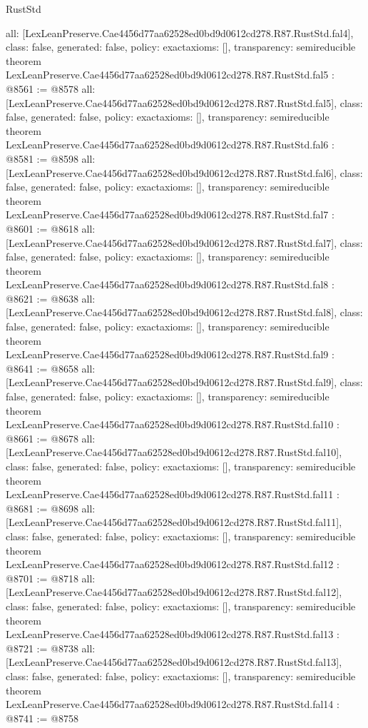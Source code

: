 \begin{lexlean}{RustStd}
\begin{coremodule}
{  all: [LexLeanPreserve.Cae4456d77aa62528ed0bd9d0612cd278.R87.RustStd.fal4],
  class: false,
  generated: false,
  policy: exact{axioms: []},
  transparency: semireducible
}
theorem LexLeanPreserve.Cae4456d77aa62528ed0bd9d0612cd278.R87.RustStd.fal5 : @8561 := @8578 {
  all: [LexLeanPreserve.Cae4456d77aa62528ed0bd9d0612cd278.R87.RustStd.fal5],
  class: false,
  generated: false,
  policy: exact{axioms: []},
  transparency: semireducible
}
theorem LexLeanPreserve.Cae4456d77aa62528ed0bd9d0612cd278.R87.RustStd.fal6 : @8581 := @8598 {
  all: [LexLeanPreserve.Cae4456d77aa62528ed0bd9d0612cd278.R87.RustStd.fal6],
  class: false,
  generated: false,
  policy: exact{axioms: []},
  transparency: semireducible
}
theorem LexLeanPreserve.Cae4456d77aa62528ed0bd9d0612cd278.R87.RustStd.fal7 : @8601 := @8618 {
  all: [LexLeanPreserve.Cae4456d77aa62528ed0bd9d0612cd278.R87.RustStd.fal7],
  class: false,
  generated: false,
  policy: exact{axioms: []},
  transparency: semireducible
}
theorem LexLeanPreserve.Cae4456d77aa62528ed0bd9d0612cd278.R87.RustStd.fal8 : @8621 := @8638 {
  all: [LexLeanPreserve.Cae4456d77aa62528ed0bd9d0612cd278.R87.RustStd.fal8],
  class: false,
  generated: false,
  policy: exact{axioms: []},
  transparency: semireducible
}
theorem LexLeanPreserve.Cae4456d77aa62528ed0bd9d0612cd278.R87.RustStd.fal9 : @8641 := @8658 {
  all: [LexLeanPreserve.Cae4456d77aa62528ed0bd9d0612cd278.R87.RustStd.fal9],
  class: false,
  generated: false,
  policy: exact{axioms: []},
  transparency: semireducible
}
theorem LexLeanPreserve.Cae4456d77aa62528ed0bd9d0612cd278.R87.RustStd.fal10 : @8661 := @8678 {
  all: [LexLeanPreserve.Cae4456d77aa62528ed0bd9d0612cd278.R87.RustStd.fal10],
  class: false,
  generated: false,
  policy: exact{axioms: []},
  transparency: semireducible
}
theorem LexLeanPreserve.Cae4456d77aa62528ed0bd9d0612cd278.R87.RustStd.fal11 : @8681 := @8698 {
  all: [LexLeanPreserve.Cae4456d77aa62528ed0bd9d0612cd278.R87.RustStd.fal11],
  class: false,
  generated: false,
  policy: exact{axioms: []},
  transparency: semireducible
}
theorem LexLeanPreserve.Cae4456d77aa62528ed0bd9d0612cd278.R87.RustStd.fal12 : @8701 := @8718 {
  all: [LexLeanPreserve.Cae4456d77aa62528ed0bd9d0612cd278.R87.RustStd.fal12],
  class: false,
  generated: false,
  policy: exact{axioms: []},
  transparency: semireducible
}
theorem LexLeanPreserve.Cae4456d77aa62528ed0bd9d0612cd278.R87.RustStd.fal13 : @8721 := @8738 {
  all: [LexLeanPreserve.Cae4456d77aa62528ed0bd9d0612cd278.R87.RustStd.fal13],
  class: false,
  generated: false,
  policy: exact{axioms: []},
  transparency: semireducible
}
theorem LexLeanPreserve.Cae4456d77aa62528ed0bd9d0612cd278.R87.RustStd.fal14 : @8741 := @8758 {
}
\end{coremodule}
\end{lexlean}
